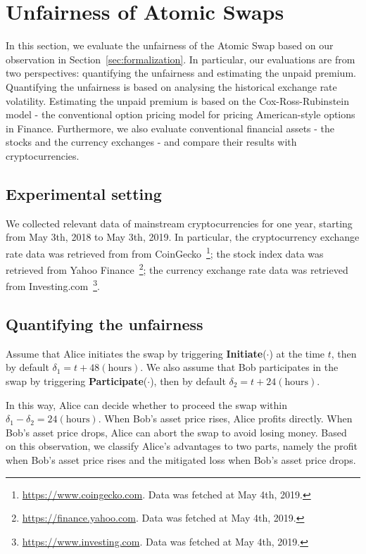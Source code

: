 \section{Unfairness of Atomic Swaps}
\label{sec:evaluation}

In this section, we evaluate the unfairness of the Atomic Swap based on our observation in Section~\ref{sec:formalization}.
In particular, our evaluations are from two perspectives: quantifying the unfairness and estimating the unpaid premium.
Quantifying the unfairness is based on analysing the historical exchange rate volatility.
Estimating the unpaid premium is based on the Cox-Ross-Rubinstein model - the conventional option pricing model for pricing American-style options in Finance.
Furthermore, we also evaluate conventional financial assets - the stocks and the currency exchanges - and compare their results with cryptocurrencies.

\subsection{Experimental setting}

We collected relevant data of mainstream cryptocurrencies for one year, starting from May 3th, 2018 to May 3th, 2019.
In particular, the cryptocurrency exchange rate data was retrieved from from CoinGecko~\footnote{\url{https://www.coingecko.com}. Data was fetched at May 4th, 2019.};
the stock index data was retrieved from Yahoo Finance~\footnote{\url{https://finance.yahoo.com}. Data was fetched at May 4th, 2019.};
the currency exchange rate data was retrieved from Investing.com~\footnote{\url{https://www.investing.com}. Data was fetched at May 4th, 2019.}.

\subsection{Quantifying the unfairness}
\label{subsec:volatility_analysis}

Assume that Alice initiates the swap by triggering \textbf{Initiate}($\cdot$) at the time $t$, then by default $\delta_1 = t + 48 (\text{hours})$.
We also assume that Bob participates in the swap by triggering \textbf{Participate}($\cdot$), then by default $\delta_2 = t + 24 (\text{hours})$.

In this way, Alice can decide whether to proceed the swap within $ \delta_1 - \delta_2 = 24 (\text{hours})$.
When Bob's asset price rises, Alice profits directly.
When Bob's asset price drops, Alice can abort the swap to avoid losing money.
Based on this observation, we classify Alice's advantages to two parts, namely the profit when Bob's asset price rises and the mitigated loss when Bob's asset price drops.

